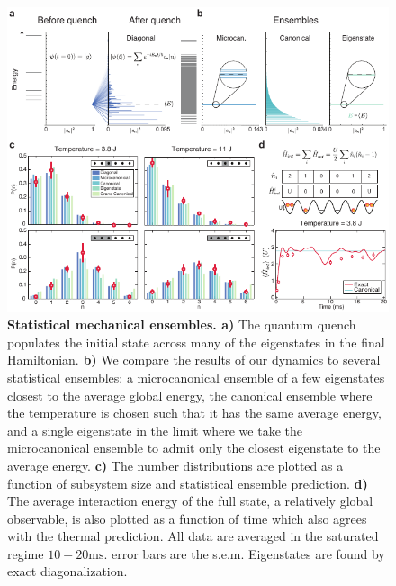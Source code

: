 \begin{figure}[t!]
		\includegraphics[width=\columnwidth]{figures/ch4/fig6_Ensemble_Figure.pdf} 
		\caption{\textbf{Statistical mechanical ensembles. a)}  The quantum quench populates the initial state across many of the eigenstates in the final Hamiltonian. \textbf{b)} We compare the results of our dynamics to several statistical ensembles: a microcanonical ensemble of a few eigenstates closest to the average global energy, the canonical ensemble where the temperature is chosen such that it has the same average energy, and a single eigenstate in the limit where we take the microcanonical ensemble to admit only the closest eigenstate to the average energy. \textbf{c)} The number distributions are plotted as a function of subsystem size and statistical ensemble prediction. \textbf{d)} The average interaction energy of the full state, a relatively global observable, is also plotted as a function of time which also agrees with the thermal prediction. All data are averaged in the saturated regime $10-20\mathrm{ms}$. error bars are the s.e.m. Eigenstates are found by exact diagonalization.}
		\label{fig:statMech}	
\end{figure}

